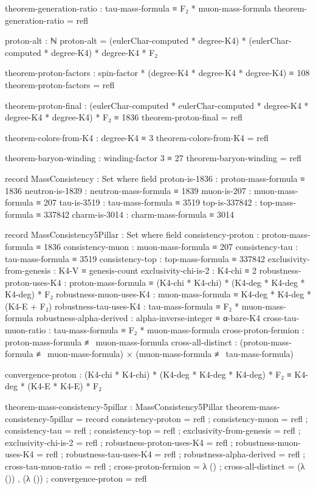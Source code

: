 \documentclass[11pt,a4paper]{book}
\begin{document}
\begin{code}

theorem-generation-ratio : tau-mass-formula ≡ F₂ * muon-mass-formula
theorem-generation-ratio = refl

proton-alt : ℕ
proton-alt = (eulerChar-computed * degree-K4) * (eulerChar-computed * degree-K4) * degree-K4 * F₂

theorem-proton-factors : spin-factor * (degree-K4 * degree-K4 * degree-K4) ≡ 108
theorem-proton-factors = refl

theorem-proton-final : (eulerChar-computed * eulerChar-computed * degree-K4 * degree-K4 * degree-K4) * F₂ ≡ 1836
theorem-proton-final = refl

theorem-colors-from-K4 : degree-K4 ≡ 3
theorem-colors-from-K4 = refl

theorem-baryon-winding : winding-factor 3 ≡ 27
theorem-baryon-winding = refl

record MassConsistency : Set where
  field
    proton-is-1836   : proton-mass-formula ≡ 1836
    neutron-is-1839  : neutron-mass-formula ≡ 1839
    muon-is-207      : muon-mass-formula ≡ 207
    tau-is-3519      : tau-mass-formula ≡ 3519
    top-is-337842    : top-mass-formula ≡ 337842
    charm-is-3014    : charm-mass-formula ≡ 3014

record MassConsistency5Pillar : Set where
  field
    consistency-proton : proton-mass-formula ≡ 1836
    consistency-muon : muon-mass-formula ≡ 207
    consistency-tau : tau-mass-formula ≡ 3519
    consistency-top : top-mass-formula ≡ 337842
    exclusivity-from-genesis : K4-V ≡ genesis-count
    exclusivity-chi-is-2 : K4-chi ≡ 2
    robustness-proton-uses-K4 : proton-mass-formula ≡ (K4-chi * K4-chi) * (K4-deg * K4-deg * K4-deg) * F₂
    robustness-muon-uses-K4 : muon-mass-formula ≡ K4-deg * K4-deg * (K4-E + F₂)
    robustness-tau-uses-K4 : tau-mass-formula ≡ F₂ * muon-mass-formula
    robustness-alpha-derived : alpha-inverse-integer ≡ α-bare-K4
    cross-tau-muon-ratio : tau-mass-formula ≡ F₂ * muon-mass-formula
    cross-proton-fermion : proton-mass-formula ≢ muon-mass-formula
    cross-all-distinct : (proton-mass-formula ≢ muon-mass-formula) × (muon-mass-formula ≢ tau-mass-formula)
    
    convergence-proton : (K4-chi * K4-chi) * (K4-deg * K4-deg * K4-deg) * F₂ ≡ K4-deg * (K4-E * K4-E) * F₂

theorem-mass-consistency-5pillar : MassConsistency5Pillar
theorem-mass-consistency-5pillar = record
  { consistency-proton = refl
  ; consistency-muon = refl
  ; consistency-tau = refl
  ; consistency-top = refl
  ; exclusivity-from-genesis = refl
  ; exclusivity-chi-is-2 = refl
  ; robustness-proton-uses-K4 = refl
  ; robustness-muon-uses-K4 = refl
  ; robustness-tau-uses-K4 = refl
  ; robustness-alpha-derived = refl
  ; cross-tau-muon-ratio = refl
  ; cross-proton-fermion = λ ()
  ; cross-all-distinct = (λ ()) , (λ ())
  ; convergence-proton = refl
  }
\end{code}
\end{document}
